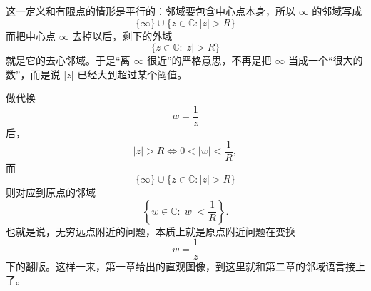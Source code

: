 \begin{zhu}{}{}
这一定义和有限点的情形是平行的：邻域要包含中心点本身，所以 $\infty$ 的邻域写成
\[
    \{\infty\}\cup\{z\in\mathbb{C}:|z|>R\}
\]
而把中心点 $\infty$ 去掉以后，剩下的外域
\[
    \{z\in\mathbb{C}:|z|>R\}
\]
就是它的去心邻域。于是``离 $\infty$ 很近''的严格意思，不再是把 $\infty$ 当成一个``很大的数''，而是说 $|z|$ 已经大到超过某个阈值。
\end{zhu}

\begin{tishi}[为什么这个定义是自然的]
做代换
\[
    w=\frac{1}{z}
\]
后，
\[
    |z|>R \Longleftrightarrow 0<|w|<\frac{1}{R},
\]
而
\[
    \{\infty\}\cup\{z\in\mathbb{C}:|z|>R\}
\]
则对应到原点的邻域
\[
    \left\{w\in\mathbb{C}:|w|<\frac{1}{R}\right\}.
\]
也就是说，无穷远点附近的问题，本质上就是原点附近问题在变换
\[
    w=\frac{1}{z}
\]
下的翻版。这样一来，第一章给出的直观图像，到这里就和第二章的邻域语言接上了。
\end{tishi}

